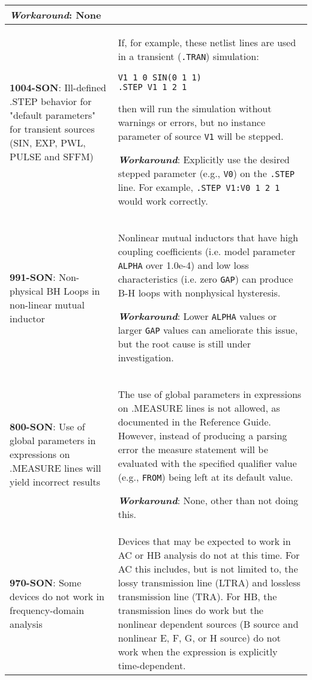 {\begin{longtable}[h] {>{\raggedright\small}m{2in}|>{\raggedright\let\\\tabularnewline\small}m{3.5in}}
\textbf{\textit{Workaround}}: None
\\ \hline

\textbf{1004-SON}: Ill-defined .STEP behavior for "default parameters" for 
transient sources (SIN, EXP, PWL, PULSE and SFFM) & If, for example,
these netlist lines are used in a transient (\texttt{.TRAN}) simulation:
\begin{verbatim}
V1 1 0 SIN(0 1 1)
.STEP V1 1 2 1
\end{verbatim}
then \Xyce{} will run the simulation without warnings or errors, but
no instance parameter of source \texttt{V1} will be stepped.  

\textbf{\textit{Workaround}}: Explicitly use the desired stepped parameter
(e.g., \texttt{V0}) on the \texttt{.STEP} line.  For example, 
\texttt{.STEP V1:V0 1 2 1} would work correctly.
\\ \hline

\textbf{991-SON}: Non-physical BH Loops in non-linear mutual inductor &
Nonlinear mutual inductors that have high coupling coefficients (i.e. 
model parameter \texttt{ALPHA} over 1.0e-4) and low loss characteristics 
(i.e. zero \texttt{GAP}) can produce B-H loops with nonphysical hysteresis.

\textbf{\textit{Workaround}}: Lower \texttt{ALPHA} values or larger 
\texttt{GAP} values can ameliorate this issue, but the root cause is 
still under investigation. 
\\ \hline

\textbf{800-SON}: Use of global parameters in expressions on .MEASURE lines
will yield incorrect results & The use of global parameters in expressions
on .MEASURE lines is not allowed, as documented in the \Xyce{} Reference Guide.
However, instead of producing a parsing error the measure statement will be
evaluated with the specified qualifier value (e.g., \texttt{FROM}) being left
at its default value.

\textbf{\textit{Workaround}}: None, other than not doing this.
\\ \hline

\textbf{970-SON}: Some devices do not work in frequency-domain analysis &
Devices that may be expected to work in AC or HB analysis do not at
this time.  For AC this includes, but is not limited to, the lossy
transmission line (LTRA) and lossless transmission line (TRA).  For
HB, the transmission lines do work but the nonlinear dependent sources
(B source and nonlinear E, F, G, or H source) do not work when the
expression is explicitly time-dependent.


\end{longtable}}
